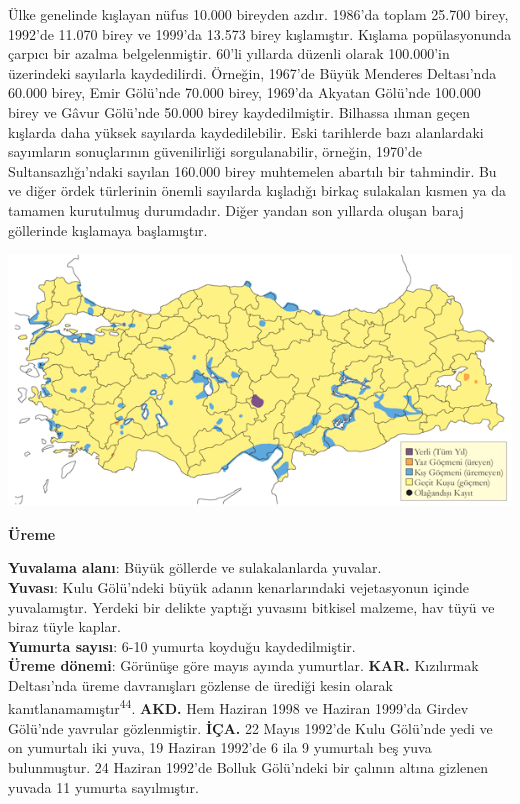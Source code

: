\documentclass[
  letterpaper,
  DIV=11,
  numbers=noendperiod]{scrreprt}
\begin{document}
Ülke genelinde kışlayan nüfus 10.000 bireyden azdır. 1986'da toplam
25.700 birey, 1992'de 11.070 birey ve 1999'da 13.573 birey kışlamıştır.
Kışlama popülasyonunda çarpıcı bir azalma belgelenmiştir. 60'li yıllarda
düzenli olarak 100.000'in üzerindeki sayılarla kaydedilirdi. Örneğin,
1967'de Büyük Menderes Deltası'nda 60.000 birey, Emir Gölü'nde 70.000
birey, 1969'da Akyatan Gölü'nde 100.000 birey ve Gâvur Gölü'nde 50.000
birey kaydedilmiştir. Bilhassa ılıman geçen kışlarda daha yüksek
sayılarda kaydedilebilir. Eski tarihlerde bazı alanlardaki sayımların
sonuçlarının güvenilirliği sorgulanabilir, örneğin, 1970'de
Sultansazlığı'ndaki sayılan 160.000 birey muhtemelen abartılı bir
tahmindir. Bu ve diğer ördek türlerinin önemli sayılarda kışladığı
birkaç sulakalan kısmen ya da tamamen kurutulmuş durumdadır. Diğer
yandan son yıllarda oluşan baraj göllerinde kışlamaya başlamıştır.

\includegraphics{images/harita_Page_018.png}

\textbf{Üreme}

\textbf{Yuvalama alanı}: Büyük göllerde ve sulakalanlarda yuvalar.\\
\textbf{Yuvası}: Kulu Gölü'ndeki büyük adanın kenarlarındaki
vejetasyonun içinde yuvalamıştır. Yerdeki bir delikte yaptığı yuvasını
bitkisel malzeme, hav tüyü ve biraz tüyle kaplar.\\
\textbf{Yumurta sayısı}: 6-10 yumurta koyduğu kaydedilmiştir.\\
\textbf{Üreme dönemi}: Görünüşe göre mayıs ayında yumurtlar.
\textbf{KAR.} Kızılırmak Deltası'nda üreme davranışları gözlense de
ürediği kesin olarak kanıtlanamamıştır\textsuperscript{44}.
\textbf{AKD.} Hem Haziran 1998 ve Haziran 1999'da Girdev Gölü'nde
yavrular gözlenmiştir. \textbf{İÇA.} 22 Mayıs 1992'de Kulu Gölü'nde yedi
ve on yumurtalı iki yuva, 19 Haziran 1992'de 6 ila 9 yumurtalı beş yuva
bulunmuştur. 24 Haziran 1992'de Bolluk Gölü'ndeki bir çalının altına
gizlenen yuvada 11 yumurta sayılmıştır.
\end{document}
